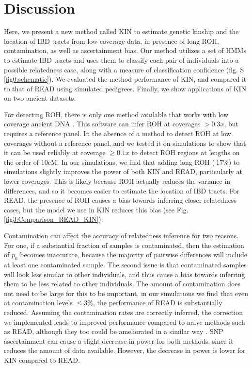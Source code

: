 \documentclass[12pt, letterpaper]{article}
\begin{document}
\section{Discussion}\label{discussion}
Here, we present a new method called KIN to estimate genetic kinship and the location of IBD tracts from low-coverage data, in presence of long ROH, contamination, as well as ascertainment bias. Our method utilizes a set of HMMs to estimate IBD tracts and uses them to classify each pair of individuals into a possible relatedness case, along with a measure of classification confidence (fig. S \ref{fig0:schematic}). We evaluated the method performance of KIN, and compared it to that of READ using simulated pedigrees. Finally, we show applications of KIN on two ancient datasets.

For detecting ROH, there is only one method available that works with low coverage ancient DNA \cite{ringbauer_parental_2021}. This software can infer ROH at coverages $>0.3x$, but requires a reference panel. In the absence of a method to detect ROH at low coverages without a reference panel, and we tested it on simulations to show that it can be used reliably at coverage $\geq 0.1x$ to detect ROH regions at lengths on the order of 10cM. 
In our simulations, we find that adding long ROH ($~17\%$) to simulations slightly improves the power of both KIN and READ, particularly at lower coverages. This is likely because ROH actually reduces the variance in differences, and so it becomes easier to estimate the location of IBD tracts. For READ, the presence of ROH causes a bias towards inferring closer relatedness cases, but the model we use in KIN reduces this bias (see Fig. \ref{fig3:Comparison_READ_KIN}). 

Contamination can affect the accuracy of relatedness inference for two reasons. For one, if a substantial fraction of samples is contaminated, then the estimation of $p_0$ becomes inaccurate, because the majority of pairwise differences will include at least one contaminated sample. The second issue is that contaminated samples will look less similar to other individuals, and thus cause a bias towards inferring them to be less related to other individuals. The amount of contamination does not need to be large for this to be important, in our simulations we find that even at contamination levels $\leq 3\%$, the performance of READ is substantially reduced. Assuming the contamination rates are correctly inferred, the correction we implemented leads to improved performance compared to naive methods such as READ, although they too could be ameliorated in a similar way \cite{laurits_skov_genetic_nodate}. SNP ascertainment can cause a slight decrease in power for both  methods, since it reduces the amount of data available. However, the decrease in power is lower for KIN compared to READ.
\end{document}
